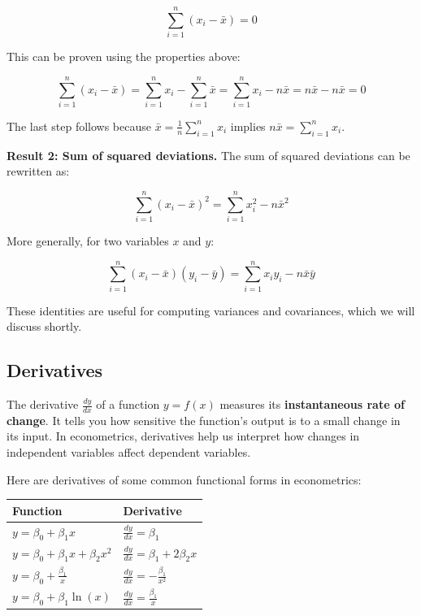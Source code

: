 \documentclass[
  letterpaper,
  DIV=11,
  numbers=noendperiod]{scrreprt}
\newcounter{none} %
\begin{document}
\[
\sum_{i=1}^{n} (x_i - \bar{x}) = 0
\]

This can be proven using the properties above:

\[
\sum_{i=1}^{n} (x_i - \bar{x}) = \sum_{i=1}^{n} x_i - \sum_{i=1}^{n} \bar{x} = \sum_{i=1}^{n} x_i - n\bar{x} = n\bar{x} - n\bar{x} = 0
\]

The last step follows because
\(\bar{x} = \frac{1}{n}\sum_{i=1}^{n} x_i\) implies
\(n\bar{x} = \sum_{i=1}^{n} x_i\).

\textbf{Result 2: Sum of squared deviations.} The sum of squared
deviations can be rewritten as:

\[
\sum_{i=1}^{n} (x_i - \bar{x})^2 = \sum_{i=1}^{n} x_i^2 - n\bar{x}^2
\]

More generally, for two variables \(x\) and \(y\):

\[
\sum_{i=1}^{n} (x_i - \bar{x})(y_i - \bar{y}) = \sum_{i=1}^{n} x_i y_i - n\bar{x}\bar{y}
\]

These identities are useful for computing variances and covariances,
which we will discuss shortly.

\subsection{Derivatives}\label{derivatives}

The derivative \(\frac{dy}{dx}\) of a function \(y = f(x)\) measures its
\textbf{instantaneous rate of change}. It tells you how sensitive the
function's output is to a small change in its input. In econometrics,
derivatives help us interpret how changes in independent variables
affect dependent variables.

Here are derivatives of some common functional forms in econometrics:

{\def\LTcaptype{none} %
\begin{longtable}[]{@{}
  >{\raggedright\arraybackslash}p{}
  >{\raggedright\arraybackslash}p{}@{}}
\toprule\noalign{}
\begin{minipage}[b]{\linewidth}\raggedright
Function
\end{minipage} & \begin{minipage}[b]{\linewidth}\raggedright
Derivative
\end{minipage} \\
\midrule\noalign{}
\endhead
\bottomrule\noalign{}
\endlastfoot
\(y = \beta_0 + \beta_1 x\) & \(\frac{dy}{dx} = \beta_1\) \\
\(y = \beta_0 + \beta_1 x + \beta_2 x^2\) &
\(\frac{dy}{dx} = \beta_1 + 2\beta_2 x\) \\
\(y = \beta_0 + \frac{\beta_1}{x}\) &
\(\frac{dy}{dx} = -\frac{\beta_1}{x^2}\) \\
\(y = \beta_0 + \beta_1 \ln(x)\) &
\(\frac{dy}{dx} = \frac{\beta_1}{x}\) \\
\end{longtable}
}
\end{document}
